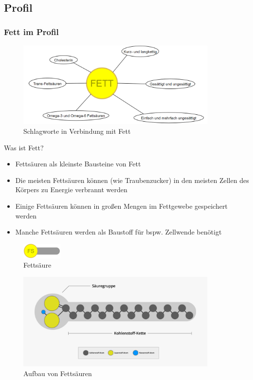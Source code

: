 \documentclass[xcolor=dvipsnames]{beamer}
\begin{document}
    \subsection{Profil}
    \begin{frame}[allowframebreaks]
        \frametitle{Fett im Profil}

        \begin{figure}
            \centering
            \includegraphics[width=10cm]{../images/fett.png}
            \caption{Schlagworte in Verbindung mit Fett}
        \end{figure}

        \framebreak

        \begin{block}{Was ist Fett?}
            \begin{itemize}
                \setlength\itemsep{1em}
                \item Fettsäuren als kleinste Bausteine von Fett
                \item Die meisten Fettsäuren können (wie Traubenzucker) in den meisten Zellen des Körpers zu Energie verbrannt werden
                \item Einige Fettsäuren können in großen Mengen im Fettgewebe gespeichert werden
                \item Manche Fettsäuren werden als Baustoff für bspw. Zellwende benötigt
            \end{itemize}
        \end{block}

        \begin{figure}
            \centering
            \includegraphics[width=2cm]{../images/fs.png}
            \caption{Fettsäure}
        \end{figure}

        \framebreak

        \begin{figure}
            \centering
            \includegraphics[width=10cm]{../images/fs.jpg}
            \caption{Aufbau von Fettsäuren}
        \end{figure}


\end{frame}
\end{document}
